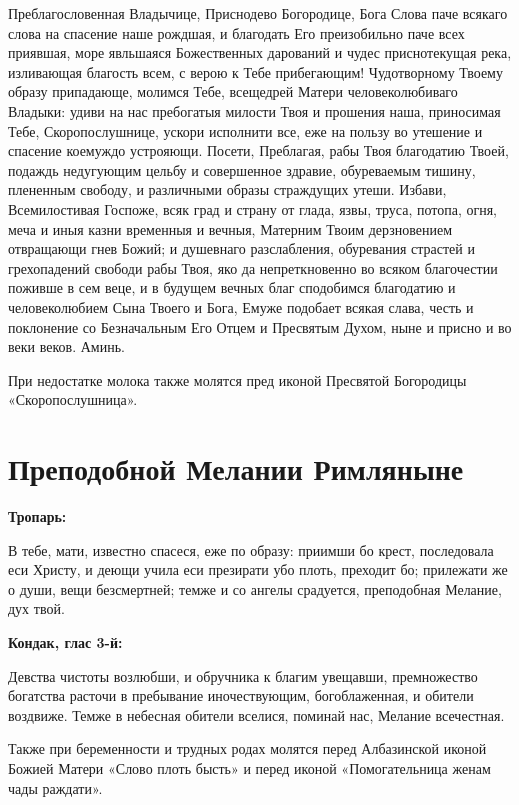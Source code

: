 Преблагословенная Владычице, Приснодево Богородице, Бога Слова паче всякаго слова на спасение наше рождшая, и благодать Его преизобильно паче всех приявшая, море явльшаяся Божественных дарований и чудес приснотекущая река, изливающая благость всем, с верою к Тебе прибегающим! Чудотворному Твоему образу припадающе, молимся Тебе, всещедрей Матери человеколюбиваго Владыки: удиви на нас пребогатыя милости Твоя и прошения наша, приносимая Тебе, Скоропослушнице, ускори исполнити все, еже на пользу во утешение и спасение коемуждо устрояющи. Посети, Преблагая, рабы Твоя благодатию Твоей, подаждь недугующим цельбу и совершенное здравие, обуреваемым тишину, плененным свободу, и различными образы страждущих утеши. Избави, Всемилостивая Госпоже, всяк град и страну от глада, язвы, труса, потопа, огня, меча и иныя казни временныя и вечныя, Матерним Твоим дерзновением отвращающи гнев Божий; и душевнаго разслабления, обуревания страстей и грехопадений свободи рабы Твоя, яко да непреткновенно во всяком благочестии поживше в сем веце, и в будущем вечных благ сподобимся благодатию и человеколюбием Сына Твоего и Бога, Емуже подобает всякая слава, честь и поклонение со Безначальным Его Отцем и Пресвятым Духом, ныне и присно и во веки веков. Аминь.

При недостатке молока также молятся пред иконой Пресвятой Богородицы «Скоропослушница».

\section{Преподобной Мелании Римляныне}
 
\bfseries Тропарь:\normalfont{}


В тебе, мати, известно спасеся, еже по образу: приимши бо крест, последовала еси Христу, и деющи учила еси презирати убо плоть, преходит бо; прилежати же о души, вещи безсмертней; темже и со ангелы срадуется, преподобная Мелание, дух твой.


\medskip
\bfseries Кондак, глас 3-й:\normalfont{}


Девства чистоты возлюбши, и обручника к благим увещавши, премножество богатства расточи в пребывание иночествующим, богоблаженная, и обители воздвиже. Темже в небесная обители вселися, поминай нас, Мелание всечестная.

Также при беременности и трудных родах молятся перед Албазинской иконой Божией Матери «Слово плоть бысть» и перед иконой «Помогательница женам чады раждати».

